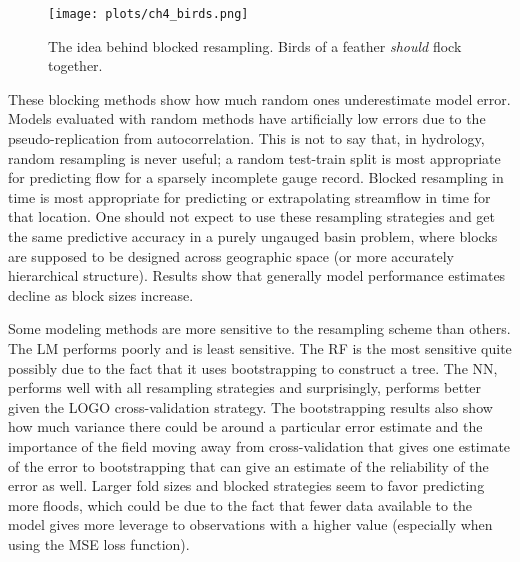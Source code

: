 \begin{figure}
  	\centering
  	\texttt{[image: plots/ch4\_birds.png]}
  	\caption[The idea behind blocked resampling.]{The idea behind blocked resampling. Birds of a feather \textit{should} flock together.}
  	\label{fig:birds}
\end{figure}

These blocking methods show how much random ones underestimate model error. Models evaluated with random methods have artificially low errors due to the pseudo-replication from autocorrelation. This is not to say that, in hydrology, random resampling is never useful; a random test-train split is most appropriate for predicting flow for a sparsely incomplete gauge record. Blocked resampling in time is most appropriate for predicting or extrapolating streamflow in time for that location. One should not expect to use these resampling strategies and get the same predictive accuracy in a purely ungauged basin problem, where blocks are supposed to be designed across geographic space (or more accurately hierarchical structure). Results show that generally model performance estimates decline as block sizes increase. 

Some modeling methods are more sensitive to the resampling scheme than others. The LM performs poorly and is least sensitive. The RF is the most sensitive quite possibly due to the fact that it uses bootstrapping to construct a tree. The NN, performs well with all resampling strategies and surprisingly, performs better given the LOGO cross-validation strategy. The bootstrapping results also show how much variance there could be around a particular error estimate and the importance of the field moving away from cross-validation that gives one estimate of the error to bootstrapping that can give an estimate of the reliability of the error as well. Larger fold sizes and blocked strategies seem to favor predicting more floods, which could be due to the fact that fewer data available to the model gives more leverage to observations with a higher value (especially when using the MSE loss function).






